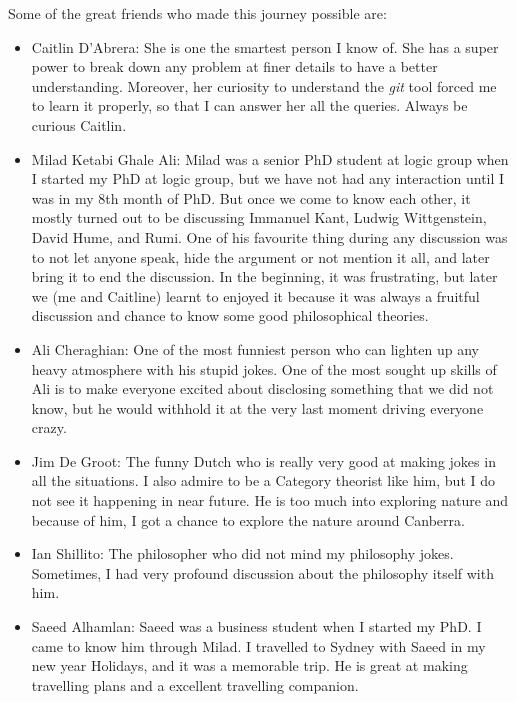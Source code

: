   
Some of the great friends who made this journey possible are:
\begin{itemize}
\item Caitlin D'Abrera: 
  She is one the smartest person I know of. She has a super power to break down any problem at finer details 
  to have a better understanding. Moreover, her curiosity to understand  the \textit{git} tool  forced me to learn it properly, 
  so that I can answer her all the queries. Always be curious Caitlin. 
  
 \item Milad Ketabi Ghale Ali: 
 Milad was a senior PhD student at logic group when I started my PhD at logic group, 
 but we have not had any interaction until I was in my 8th month of PhD. But once 
 we come to know each other, it mostly turned out to be discussing 
 Immanuel Kant, Ludwig Wittgenstein, David Hume, and Rumi. 
 One of his favourite thing during any discussion was to
 not let anyone speak, hide the argument or not mention it all, and later bring it 
 to end the discussion. In the beginning, it was frustrating, but later we (me and 
 Caitline) learnt to enjoyed it because it was always a fruitful discussion
 and chance to know some good philosophical theories.  
 
 \item  Ali Cheraghian:
  One of the most funniest person who can lighten up any heavy atmosphere 
  with his stupid jokes.  One of the most sought up skills of Ali is to 
  make everyone excited about disclosing something that we did not know, 
  but he would withhold it at the  very last moment driving everyone crazy. 
  
 
  \item   Jim De Groot:
  The funny Dutch who is really very good at making jokes in all the situations. I also 
  admire to be a Category theorist like him, but I do not see it happening in near 
  future. He is too much into exploring nature and because of him, I got a chance 
  to explore the nature around Canberra. 
  
  \item  Ian Shillito:
  The philosopher who did not mind my philosophy jokes.  Sometimes, I had very 
  profound discussion about the philosophy itself with him. 
  
  
  
  \item Saeed Alhamlan: 
  Saeed was a business student when I started my PhD. I came to know him through 
  Milad. I travelled to Sydney with Saeed in my new year Holidays, and it was 
  a memorable trip. He is great at making travelling plans and a excellent travelling 
  companion. 
  
\end{itemize} 


